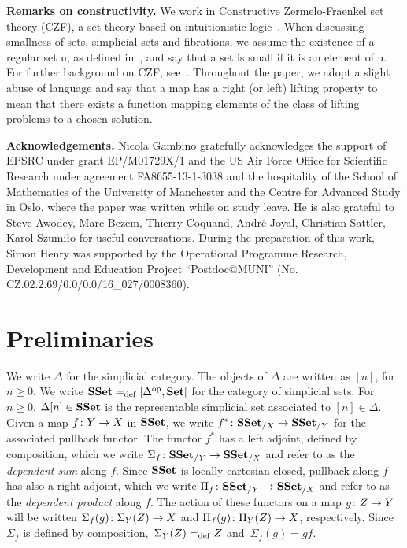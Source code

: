 \documentclass[reqno,10pt,a4paper,oneside,draft]{amsart}
\begin{document}
\noindent
\textbf{Remarks on constructivity.} We work in  Constructive Zermelo-Fraenkel set theory (CZF),
a set theory based on intuitionistic logic~\cite{AczelP:typtic-I}. When discussing smallness of sets,
simplicial sets and fibrations, we assume the existence of a regular set $\mathsf{u}$, as defined 
in~\cite{AczelP:typtic-II}, and say that a set is small if it is an element of $\mathsf{u}$.
For further background on CZF, see~\cite{AczelP:notcst}. 
Throughout the paper, we adopt a slight abuse of language and say that a map has a right (or left) lifting property to mean that there exists a function mapping elements of the class of lifting problems to a chosen solution. 




\noindent 
\textbf{Acknowledgements.} Nicola Gambino gratefully acknowledges the support of
EPSRC under grant EP/M01729X/1 and the US Air Force Office for Scientific Research under 
agreement FA8655-13-1-3038 and the hospitality of the 
School of Mathematics of the University of Manchester and the Centre for Advanced Study in Oslo,
where the paper was written while on study leave. He is also grateful to Steve Awodey, Marc Bezem, Thierry Coquand, Andr\'e Joyal, Christian Sattler, Karol Szumi{\l}o  for useful conversations. 
During the preparation of this work, Simon Henry was supported by the Operational Programme Research, Development and Education Project ``Postdoc@MUNI'' (No. CZ.02.2.69/0.0/0.0/16\_027/0008360).





\section{Preliminaries} 
\label{sec:preliminaries}




We write $\Delta$ for the simplicial category. The objects of $\Delta$ are written as $[n]$, for $n \geq 0$.
We write $\mathbf{SSet} =_{\operatorname{def}} [\Delta^{\operatorname{op}}, \mathbf{Set}]$ for the category of simplicial sets. For $n \geq 0$, $\Delta[n] \in \mathbf{SSet}$ is the representable simplicial set associated to $[n] \in \Delta$. Given a map $f \colon Y \to X$ in $\mathbf{SSet}$, we write $f^* \colon \mathbf{SSet}_{/X} \to \mathbf{SSet}_{/Y}$
for the associated pullback functor. The functor $f^*$ has a left adjoint, defined
by composition, which we write $\Sigma_{f} \colon \mathbf{SSet}_{/Y} \to \mathbf{SSet}_{/X}$ and refer
to as the \emph{dependent sum} along $f$. Since $\mathbf{SSet}$ is locally cartesian closed, pullback
along $f$ has also a right adjoint, which we write 
$\Pi_f \colon \mathbf{SSet}_{/Y} \to \mathbf{SSet}_{/X}$ and refer to as the \emph{dependent
product}  along $f$. The action of these functors on a
map $g \colon Z \to Y$ will be written $\Sigma_f(g) \colon \Sigma_Y(Z) \to X$ and 
$\Pi_f(g) \colon \Pi_Y(Z) \to X$, respectively. Since  $\Sigma_f$ is defined by composition,~$\Sigma_Y(Z) =_{\operatorname{def}} Z$ and~$\Sigma_f(g) = g f $. 
\end{document}
